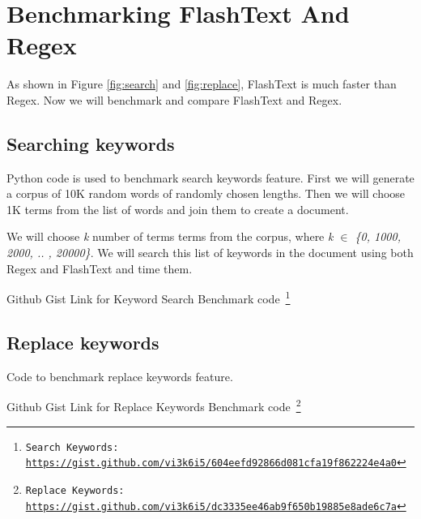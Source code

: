 \section{Benchmarking FlashText And Regex}
As shown in Figure \ref{fig:search} and \ref{fig:replace}, FlashText is much faster than Regex. Now we will benchmark and compare FlashText and Regex.

\subsection{Searching keywords}

Python code is used to benchmark search keywords feature. First we will generate a corpus of 10K random words of randomly chosen lengths. Then we will choose 1K terms from the list of words and join them to create a document.\hfill\break

We will choose \textit{k} number of terms terms from the corpus, where \textit{k $\in$ \{0, 1000, 2000, .. , 20000\}}. We will search this list of keywords in the document using both Regex and FlashText and time them.\hfill\break



Github Gist Link for Keyword Search Benchmark code~\footnote{ \texttt{Search Keywords: \url{https://gist.github.com/vi3k6i5/604eefd92866d081cfa19f862224e4a0}}}

\subsection{Replace keywords}

Code to benchmark replace keywords feature.\hfill\break



Github Gist Link for Replace Keywords Benchmark code~\footnote{ \texttt{Replace Keywords: \url{https://gist.github.com/vi3k6i5/dc3335ee46ab9f650b19885e8ade6c7a}}}